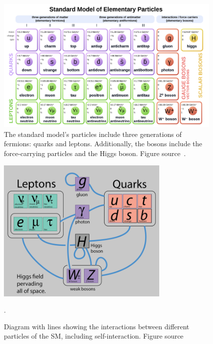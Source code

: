 \begin{figure}[t!]
\centering
\includegraphics[width=0.99\textwidth]{figures/SM_include_antimatter.png}
\caption[The particles of the SM]
{The standard model's particles include three generations of fermions: quarks and leptons. Additionally, the bosons include the force-carrying particles and the Higgs boson.
Figure source~\cite{SMtable}.}
\label{fig:SMParticles}
\end{figure}

\begin{figure}[t!]
\centering
\includegraphics[width=0.75\textwidth]{figures/interactions_SM.png}
\caption[The SM particles and their interactions]
{Diagram with lines showing the interactions between different particles of the SM, including self-interaction.
Figure source~\cite{Particle_interactions}}.
\label{fig:SMinteractions}
\end{figure}
